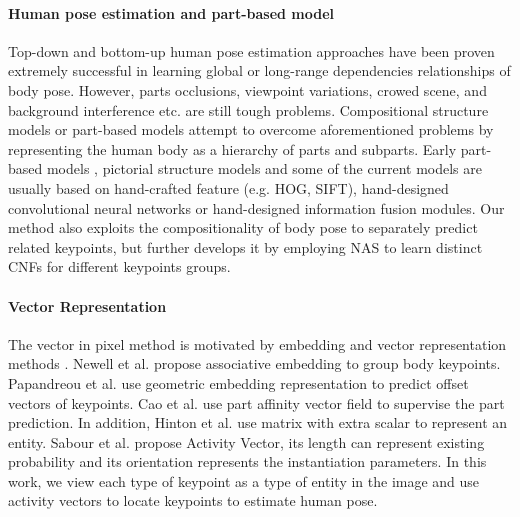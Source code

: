 \documentclass[journal]{IEEEtran}
\begin{document}
\paragraph{Human pose estimation and part-based model}
Top-down \cite{wei2016convolutional,xiao2018simple,Sun_2019_CVPR,chen2018cascaded,fang2017rmpe,he2017mask} and bottom-up \cite{cao2017realtime,insafutdinov2016eccv,insafutdinov2017arttrack,kocabas2018multiposenet,newell2017associative} human pose estimation approaches have been proven extremely successful in learning global or long-range dependencies relationships of body pose. However, parts occlusions, viewpoint variations, crowed scene, and background interference etc. are still tough problems. Compositional structure models or part-based models \cite{belagiannis2017recurrent,tang2018deeply,sun2017compositional,bienenstock1997compositionality,felzenszwalb2008discriminatively,andriluka2009pictorial,felzenszwalb2005pictorial,park2017attribute,sun2011articulated,7226826,Tang_2019_CVPR,8482293} attempt to overcome aforementioned problems by representing the human body as a hierarchy of parts and subparts. Early part-based models \cite{sun2011articulated,yang2012articulated},  pictorial structure models \cite{felzenszwalb2005pictorial, felzenszwalb2008discriminatively, andriluka2009pictorial}  and some of the current models \cite{tompson2014joint, Chu_2016_CVPR, chen2017adversarial, ke2018multi, tang2018deeply, Tang_2019_CVPR} are usually based on hand-crafted feature (e.g. HOG, SIFT), hand-designed convolutional neural networks or hand-designed information fusion modules. Our method also exploits the compositionality of body pose to separately predict related keypoints, but further develops it by employing NAS to learn distinct CNFs for different keypoints groups.

\paragraph{Vector Representation}
The vector in pixel method is motivated by embedding and vector representation methods \cite{newell2017associative,Papandreou2018PersonLabPP,cao2017realtime,papandreou2017towards, e2018matrix,sabour2017dynamic}. Newell et al. \cite{newell2017associative} propose associative embedding to group body keypoints. Papandreou et al. \cite{Papandreou2018PersonLabPP} use geometric embedding representation to predict offset vectors of keypoints. Cao et al. \cite{cao2017realtime} use part affinity vector field to supervise the part prediction. In addition, Hinton et al. \cite{e2018matrix} use matrix with extra scalar to represent an entity. Sabour et al. \cite{sabour2017dynamic} propose Activity Vector, its length can represent existing probability and its orientation represents the instantiation parameters. In this work, we view each type of keypoint as a type of entity in the image and use activity vectors to locate keypoints to estimate human pose.
\end{document}
